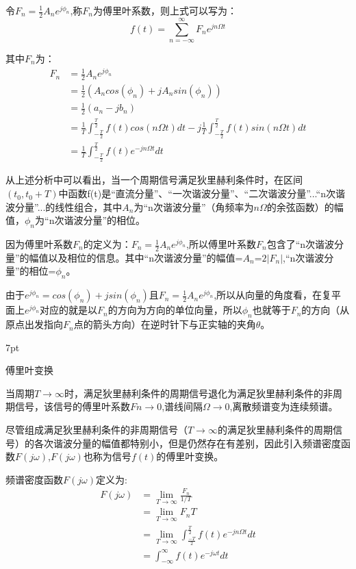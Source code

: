 \documentclass{article}
\numberwithin{equation}{section}
\numberwithin{figure}{section}
\newenvironment{formal}{%
\def\FrameCommand{%
\hspace{1pt}%
{\color{DarkBlue}\vrule width 2pt}%
{\color{formalshade}\vrule width 4pt}%
\colorbox{formalshade}%
}%
\MakeFramed{\advance\hsize-\width\FrameRestore}%
\noindent\hspace{-4.55pt}%
\begin{adjustwidth}{}{7pt}%
\vspace{2pt}\vspace{2pt}%
}
{%
\vspace{2pt}\end{adjustwidth}\endMakeFramed%
}
\begin{document}
令$F_n=\frac{1}{2}A_ne^{j\phi_n}$,称$F_n$为傅里叶系数，则上式可以写为：
\begin{equation}
    f(t)=\sum_{n = -\infty}^{\infty}F_ne^{jn\Omega t}
\end{equation}

其中$F_n$为：
\begin{equation}
    \begin{split}
        F_n&=\frac{1}{2}A_ne^{j\phi_n}\\
        &=\frac{1}{2}(A_ncos(\phi_n)+jA_nsin(\phi_n))\\
        &=\frac{1}{2}(a_n-jb_n)\\
        &=\frac{1}{T}\int_{-\frac{T}{2}}^{\frac{T}{2}}f(t)cos(n\Omega t)dt-j\frac{1}{T}\int_{-\frac{T}{2}}^{\frac{T}{2}}f(t)sin(n\Omega t)dt\\
        &=\frac{1}{T}\int_{-\frac{T}{2}}^{\frac{T}{2}}f(t)e^{-jn\Omega t}dt
    \end{split}
\end{equation}

从上述分析中可以看出，当一个周期信号满足狄里赫利条件时，在区间$(t_0,t_0+T)$中函数f(t)是“直流分量”、“一次谐波分量”、“二次谐波分量”...“n次谐波分量”...的线性组合，其中$A_n$为“n次谐波分量”（角频率为$n\Omega$的余弦函数）的幅值，$\phi_n$为“n次谐波分量”的相位。

因为傅里叶系数$F_n$的定义为：$F_n=\frac{1}{2}A_ne^{j\phi_n}$,所以傅里叶系数$F_n$包含了“n次谐波分量”的幅值以及相位的信息。其中“n次谐波分量”的幅值=$A_n$=$2|F_n|$,“n次谐波分量”的相位=$\phi_n$。

由于$e^{j\phi_n}=cos(\phi_n)+jsin(\phi_n)$且$F_n=\frac{1}{2}A_ne^{j\phi_n}$,所以从向量的角度看，在复平面上$e^{j\phi_n}$对应的就是以$F_n$的方向为方向的单位向量，所以$\phi_n$也就等于$F_n$的方向（从原点出发指向$F_n$点的箭头方向）在逆时针下与正实轴的夹角$\theta $。

\begin{formal}
    傅里叶变换
\end{formal}

当周期$T\rightarrow \infty$时，满足狄里赫利条件的周期信号退化为满足狄里赫利条件的非周期信号，该信号的傅里叶系数$Fn\rightarrow 0$,谱线间隔$\Omega \rightarrow 0$,离散频谱变为连续频谱。

尽管组成满足狄里赫利条件的非周期信号（$T\rightarrow \infty$的满足狄里赫利条件的周期信号）的各次谐波分量的幅值都特别小，但是仍然存在有差别，因此引入频谱密度函数$F(j\omega)$,$F(j\omega)$也称为信号$f(t)$的傅里叶变换。

频谱密度函数$F(j\omega)$定义为:
\begin{equation}
    \begin{split}
        F(j\omega)&=\lim_{T \to \infty} \frac{F_n}{1/T}\\
        &=\lim_{T \to \infty} F_nT\\
        &=\lim_{T \to \infty}\int_{\frac{-T}{2}}^{\frac{T}{2}}f(t)e^{-jn\Omega t}dt\\
        &=\int_{-\infty}^{\infty}f(t)e^{-j\omega t}dt
    \end{split}
\end{equation}
\end{document}
